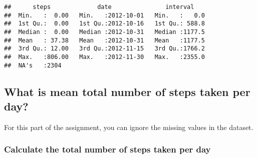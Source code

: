 \documentclass[]{article}
\newenvironment{Shaded}{\begin{snugshade}}{\end{snugshade}}
\newcommand{\CommentTok}[1]{\textcolor[rgb]{0.56,0.35,0.01}{\textit{#1}}}
\newcommand{\DataTypeTok}[1]{\textcolor[rgb]{0.13,0.29,0.53}{#1}}
\newcommand{\KeywordTok}[1]{\textcolor[rgb]{0.13,0.29,0.53}{\textbf{#1}}}
\newcommand{\NormalTok}[1]{#1}
\newcommand{\OperatorTok}[1]{\textcolor[rgb]{0.81,0.36,0.00}{\textbf{#1}}}
\newcommand{\StringTok}[1]{\textcolor[rgb]{0.31,0.60,0.02}{#1}}
\begin{document}
\begin{Shaded}
\end{Shaded}

\begin{verbatim}
##      steps             date               interval     
##  Min.   :  0.00   Min.   :2012-10-01   Min.   :   0.0  
##  1st Qu.:  0.00   1st Qu.:2012-10-16   1st Qu.: 588.8  
##  Median :  0.00   Median :2012-10-31   Median :1177.5  
##  Mean   : 37.38   Mean   :2012-10-31   Mean   :1177.5  
##  3rd Qu.: 12.00   3rd Qu.:2012-11-15   3rd Qu.:1766.2  
##  Max.   :806.00   Max.   :2012-11-30   Max.   :2355.0  
##  NA's   :2304
\end{verbatim}

\hypertarget{what-is-mean-total-number-of-steps-taken-per-day}{%
\subsection{What is mean total number of steps taken per
day?}\label{what-is-mean-total-number-of-steps-taken-per-day}}

For this part of the assignment, you can ignore the missing values in
the dataset.

\hypertarget{calculate-the-total-number-of-steps-taken-per-day}{%
\subsubsection{Calculate the total number of steps taken per
day}\label{calculate-the-total-number-of-steps-taken-per-day}}

\begin{Shaded}
\end{Shaded}
\end{document}
